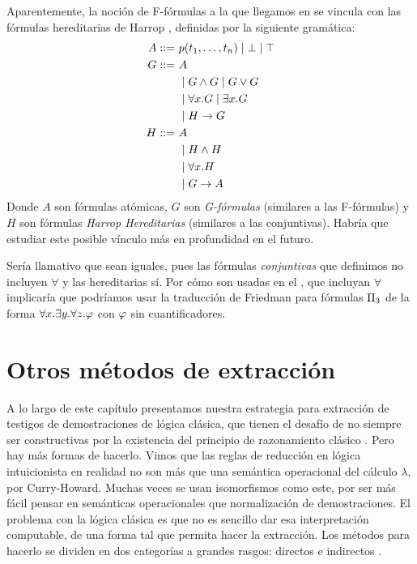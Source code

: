 \begin{obs}
    \label{fi:obs:harrop}

    Aparentemente, la noción de F-fórmulas a la que llegamos en  se vincula con las fórmulas hereditarias de Harrop \cite{harrop}, definidas por la siguiente gramática:
    \begin{align*}
        A ::=\ & p(t_1, \dots, t_n) \mid \bot \mid \top \\
        G ::=\ & A \\
            &\mid G \wedge G \mid G \vee G \\
            &\mid \forall x . G \mid \exists x. G \\
            &\mid H \to G\\
        H ::=\ & A \\
                       & \mid H \wedge H                    \\
                       & \mid \forall x . H\\
                       & \mid G \to A
    \end{align*}
    Donde $A$ son fórmulas atómicas, $G$ son \textit{G-fórmulas} (similares a las F-fórmulas) y $H$ son fórmulas \textit{Harrop Hereditarias} (similares a las conjuntivas). Habría que estudiar este posible vínculo más en profundidad en el futuro.

    Sería llamativo que sean iguales, pues las fórmulas \textit{conjuntivas} que definimos no incluyen $\forall$ y las hereditarias sí. Por cómo son usadas en el , que incluyan $\forall$ implicaría que podríamos usar la traducción de Friedman para fórmulas $\Pi_{3}$ de la forma $\forall x. \exists y . \forall z . \varphi$ con $\varphi$ sin cuantificadores.
\end{obs}

\section{Otros métodos de extracción}

A lo largo de este capítulo presentamos nuestra estrategia para extracción de testigos de demostraciones de lógica clásica, que tienen el desafío de no siempre ser constructivas por la existencia del principio de razonamiento clásico . Pero hay más formas de hacerlo.
Vimos que las reglas de reducción en lógica intuicionista en realidad no son más que una semántica operacional del cálculo $\lambda$, por Curry-Howard. Muchas veces se usan isomorfismos como este, por ser más fácil pensar en semánticas operacionales que normalización de demostraciones. El problema con la lógica clásica es que no es sencillo dar esa interpretación computable, de una forma tal que permita hacer la extracción. Los métodos para hacerlo se dividen en dos categorías a grandes rasgos: directos e indirectos \cite{miquel-friedman}.

